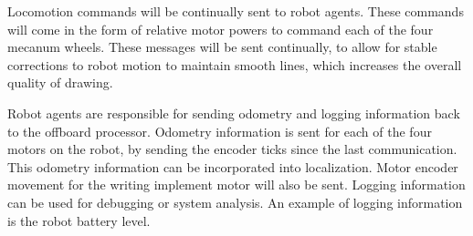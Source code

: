 Locomotion commands will be continually sent to robot agents. These commands will come in the form of relative motor powers to command each of the four mecanum wheels. These messages will be sent continually, to allow for stable corrections to robot motion to maintain smooth lines, which increases the overall quality of drawing.

Robot agents are responsible for sending odometry and logging information back to the offboard processor. Odometry information is sent for each of the four motors on the robot, by sending the encoder ticks since the last communication. This odometry information can be incorporated into localization. Motor encoder movement for the writing implement motor will also be sent. Logging information can be used for debugging or system analysis. An example of logging information is the robot battery level.

